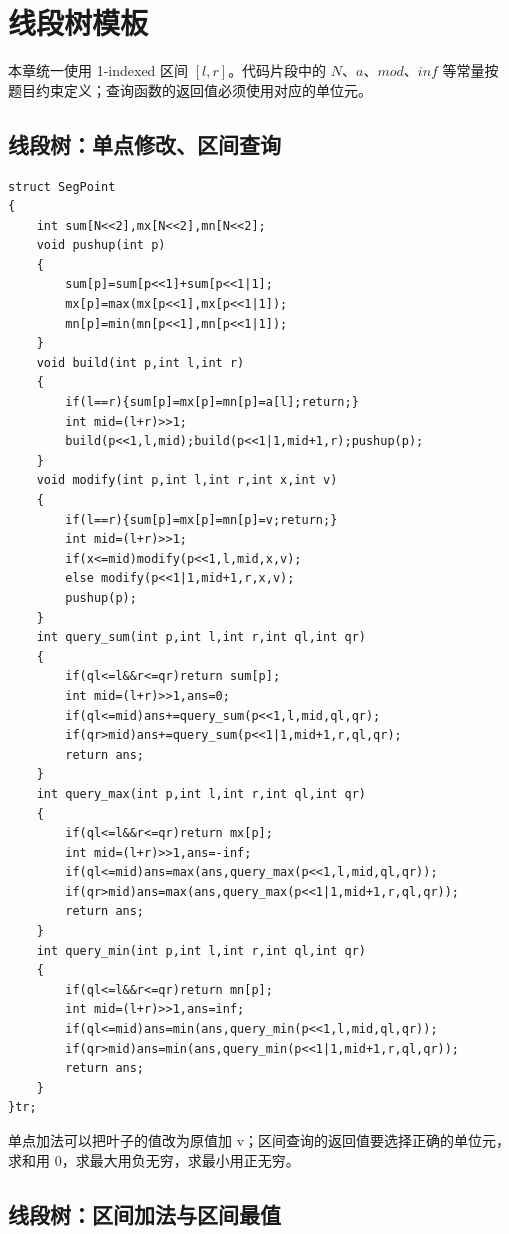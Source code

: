 \section{线段树模板}
\par \noindent 本章统一使用 1-indexed 区间 $[l,r]$。代码片段中的 $N$、$a$、$mod$、$inf$ 等常量按题目约束定义；查询函数的返回值必须使用对应的单位元。


\subsection{线段树：单点修改、区间查询}

\begin{verbatim}
struct SegPoint
{
    int sum[N<<2],mx[N<<2],mn[N<<2];
    void pushup(int p)
    {
        sum[p]=sum[p<<1]+sum[p<<1|1];
        mx[p]=max(mx[p<<1],mx[p<<1|1]);
        mn[p]=min(mn[p<<1],mn[p<<1|1]);
    }
    void build(int p,int l,int r)
    {
        if(l==r){sum[p]=mx[p]=mn[p]=a[l];return;}
        int mid=(l+r)>>1;
        build(p<<1,l,mid);build(p<<1|1,mid+1,r);pushup(p);
    }
    void modify(int p,int l,int r,int x,int v)
    {
        if(l==r){sum[p]=mx[p]=mn[p]=v;return;}
        int mid=(l+r)>>1;
        if(x<=mid)modify(p<<1,l,mid,x,v);
        else modify(p<<1|1,mid+1,r,x,v);
        pushup(p);
    }
    int query_sum(int p,int l,int r,int ql,int qr)
    {
        if(ql<=l&&r<=qr)return sum[p];
        int mid=(l+r)>>1,ans=0;
        if(ql<=mid)ans+=query_sum(p<<1,l,mid,ql,qr);
        if(qr>mid)ans+=query_sum(p<<1|1,mid+1,r,ql,qr);
        return ans;
    }
    int query_max(int p,int l,int r,int ql,int qr)
    {
        if(ql<=l&&r<=qr)return mx[p];
        int mid=(l+r)>>1,ans=-inf;
        if(ql<=mid)ans=max(ans,query_max(p<<1,l,mid,ql,qr));
        if(qr>mid)ans=max(ans,query_max(p<<1|1,mid+1,r,ql,qr));
        return ans;
    }
    int query_min(int p,int l,int r,int ql,int qr)
    {
        if(ql<=l&&r<=qr)return mn[p];
        int mid=(l+r)>>1,ans=inf;
        if(ql<=mid)ans=min(ans,query_min(p<<1,l,mid,ql,qr));
        if(qr>mid)ans=min(ans,query_min(p<<1|1,mid+1,r,ql,qr));
        return ans;
    }
}tr;
\end{verbatim}
单点加法可以把叶子的值改为原值加 v；区间查询的返回值要选择正确的单位元，求和用 0，求最大用负无穷，求最小用正无穷。

\subsection{线段树：区间加法与区间最值}


